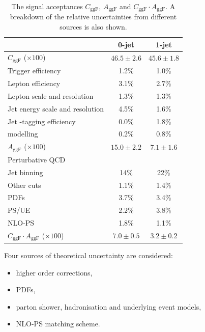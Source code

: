 \begin{table}[t]
	\begin{tabular}{l@{}c@{\hskip 0.2in}c}
		\toprule
		& 0-jet & 1-jet \\
		\midrule
		$C_{\text{ggF}}$ ($\times 100$) & $46.5\pm2.6$ & $45.6\pm1.8$ \\
		\quad Trigger efficiency              & 1.2\% & 1.0\% \\
		\quad Lepton efficiency               & 3.1\% & 2.7\% \\
		\quad Lepton \pt scale and resolution & 1.3\% & 1.3\% \\
		\quad Jet energy scale and resolution & 4.5\% & 1.6\% \\
		\quad Jet \Pbottom-tagging efficiency & 0.0\% & 1.8\% \\
		\quad \met modelling                  & 0.2\% & 0.8\% \\
		\cmidrule(lr){1-3}
		$A_{\text{ggF}}$ ($\times 100$) & $15.0\pm2.2$ & $7.1\pm1.6$ \\
		\quad Perturbative QCD \\
		\quad\quad Jet binning & 14\%  & 22\%  \\
		\quad\quad Other cuts  & 1.1\% & 1.4\% \\
		\quad PDFs             & 3.7\% & 3.4\% \\
		\quad PS/UE            & 2.2\% & 3.8\% \\
		\quad NLO-PS           & 1.8\% & 1.1\% \\
		\cmidrule(lr){1-3}
		$C_{\text{ggF}} \cdot A_{\text{ggF}}$ ($\times 100$) & $7.0\pm0.5$ & $3.2\pm0.2$ \\
		\bottomrule
	\end{tabular}
	\caption{The signal acceptances $C_{\text{ggF}}$, $A_{\text{ggF}}$ and $C_{\text{ggF}} 
	\cdot A_{\text{ggF}}$. A breakdown of the relative uncertainties from different sources 
	is also shown.}
	\label{tab:ggF:cggF_aggF}
\end{table}

\newpage
Four sources of theoretical uncertainty are considered:
\begin{itemize}[noitemsep,nolistsep]
	\item higher order corrections,
	\item PDFs,
	\item parton shower, hadronisation and underlying event models,
	\item NLO-PS matching scheme.
\end{itemize}

